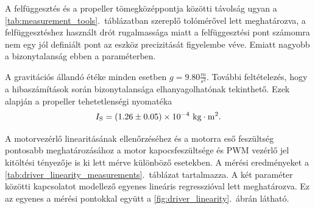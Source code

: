 A felfüggesztés és a propeller tömegközéppontja közötti távolság ugyan a \ref{tab:measurement_tools}.~táblázatban szereplő tolómérővel lett meghatározva, a felfüggesztéshez használt drót rugalmassága miatt 
a felfüggesztési pont számomra nem egy jól definiált pont az eszköz precizitását figyelembe véve. Emiatt 
nagyobb a bizonytalanság ebben a paraméterben.

A gravitációs állandó étéke minden esetben \(g = 9.80 \frac{m}{s^2}\). További feltételezés, hogy a 
hibaszámítások során bizonytalansága elhanyagolhatónak tekinthető. Ezek alapján a propeller 
tehetetlenségi nyomatéka
\begin{equation}
    I_{\mathrm{S}} = (1.26 \pm 0.05)\times10^{-4}~\mathrm{kg \cdot m^2}.
\end{equation}

A motorvezérlő linearitásának ellenőrzéséhez és a motorra eső feszültség pontosabb meghatározásához 
a motor kapocsfeszültsége és PWM vezérlő jel kitöltési tényezője is ki lett mérve különböző esetekben.
A mérési eredményeket a \ref{tab:driver_linearity_measurements}.~táblázat tartalmazza. A két paraméter közötti kapcsolatot modellező 
egyenes lineáris regresszióval lett meghatározva. Ez az egyenes a mérési pontokkal együtt a \ref{fig:driver_linearity}.~ábrán látható.

